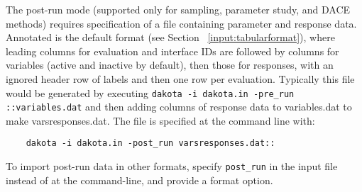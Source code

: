 The post-run mode (supported only for sampling, parameter study, and
DACE methods) requires specification of a file containing parameter
and response data.  Annotated is the default format (see Section
~\ref{input:tabularformat}), where leading columns for evaluation and
interface IDs are followed by columns for variables (active and
inactive by default), then those for responses, with an ignored header
row of labels and then one row per evaluation.  Typically this file
would be generated by executing \texttt{dakota -i dakota.in -pre\_run
  ::variables.dat} and then adding columns of response data to
variables.dat to make varsresponses.dat.  The file is specified at the
command line with:
\begin{small}
\begin{verbatim}
    dakota -i dakota.in -post_run varsresponses.dat::
\end{verbatim}
\end{small}
To import post-run data in other formats, specify \texttt{post\_run}
in the input file instead of at the command-line, and provide a format
option.

